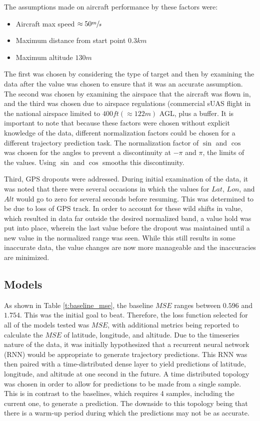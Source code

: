 \documentclass[10pt]{IEEEtran}
\begin{document}
The assumptions made on aircraft performance by these factors were:

\begin{itemize}
    \item Aircraft max speed $\approx 50 \sfrac{m}{s}$
    \item Maximum distance from start point $0.3 km$
    \item Maximum altitude $130 m$
\end{itemize}

The first was chosen by considering the type of target and then by examining the data after the value was chosen to ensure that it was an accurate assumption. The second was chosen by examining the airspace that the aircraft was flown in, and the third was chosen due to airspace regulations (commercial sUAS flight in the national airspace limited to $400 ft \left(\approx 122m\right)$ AGL, plus a buffer. It is important to note that because these factors were chosen without explicit knowledge of the data, different normalization factors could be chosen for a different trajectory prediction task. The normalization factor of $\sin$ and $\cos$ was chosen for the angles to prevent a discontinuity at $-\pi$ and $\pi$, the limits of the values. Using $\sin$ and $\cos$ smooths this discontinuity.

Third, GPS dropouts were addressed. During initial examination of the data, it was noted that there were several occasions in which the values for $Lat$, $Lon$, and $Alt$ would go to zero for several seconds before resuming. This was determined to be due to loss of GPS track. In order to account for these wild shifts in value, which resulted in data far outside the desired normalized band, a value hold was put into place, wherein the last value before the dropout was maintained until a new value in the normalized range was seen. While this still results in some inaccurate data, the value changes are now more manageable and the inaccuracies are minimized.

\subsection{Models}
As shown in Table \ref{t:baseline_mse}, the baseline $MSE$ ranges between $0.596$ and $1.754$. This was the initial goal to beat. Therefore, the loss function selected for all of the models tested was $MSE$, with additional metrics being reported to calculate the $MSE$ of latitude, longitude, and altitude. Due to the timeseries nature of the data, it was initially hypothesized that a recurrent neural network (RNN) would be appropriate to generate trajectory predictions. This RNN was then paired with a time-distributed dense layer to yield predictions of latitude, longitude, and altitude at one second in the future. A time distributed topology was chosen in order to allow for predictions to be made from a single sample. This is in contrast to the baselines, which requires 4 samples, including the current one, to generate a prediction. The downside to this topology being that there is a warm-up period during which the predictions may not be as accurate.
\end{document}
